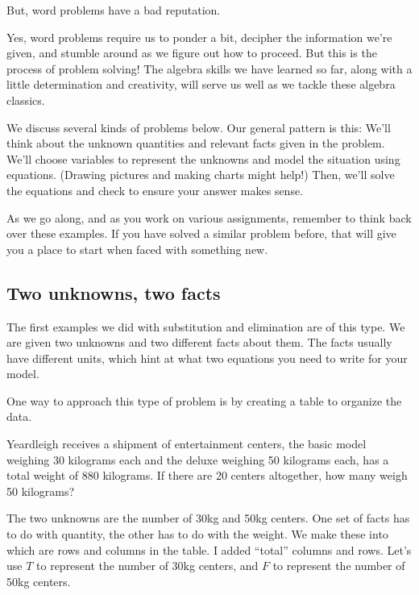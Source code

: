 But, word problems have a bad reputation.

Yes, word problems require us to ponder a bit, decipher the information we're given, and stumble around as we figure out how to proceed. But this is the process of problem solving! The algebra skills we have learned so far, along with a little determination and creativity, will serve us well as we tackle these algebra classics.

We discuss several kinds of problems below. Our general pattern is this: We'll think about the unknown quantities and relevant facts given in the problem. We'll choose variables to represent the unknowns and model the situation using equations. (Drawing pictures and making charts might help!) Then, we'll solve the equations and check to ensure your answer makes sense.

As we go along, and as you work on various assignments, remember to think back over these examples. If you have solved a similar problem before, that will give you a place to start when faced with something new.

\subsection*{Two unknowns, two facts}

The first examples we did with substitution and elimination are of this type. We are given two unknowns and two different facts about them. The facts usually have different units, which hint at what two equations you need to write for your model.

One way to approach this type of problem is by creating a table to organize the data.

\begin{boxedex}
Yeardleigh receives a shipment of entertainment centers, the basic model weighing 30 kilograms each and the deluxe weighing 50 kilograms each, has a total weight of 880 kilograms. If there are 20 centers altogether, how many weigh 50 kilograms?
\end{boxedex}

The two unknowns are the number of 30kg and 50kg centers. One set of facts has to do with quantity, the other has to do with the weight. We make these into which are rows and columns in the table. I added ``total'' columns and rows. Let's use $T$ to represent the number of 30kg centers, and $F$ to represent the number of 50kg centers.

